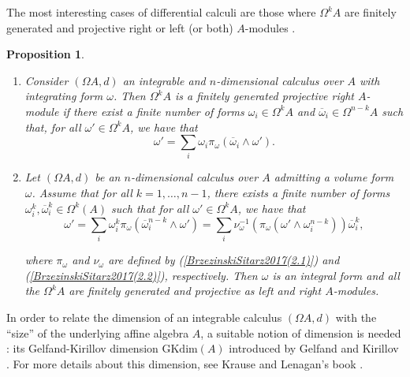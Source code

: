 \documentclass{amsart}
\newtheorem{proposition}[theorem]{Proposition}
\theoremstyle{definition}
\theoremstyle{remark}
\numberwithin{equation}{section}
\begin{document}
The most interesting cases of differential calculi are those where $\Omega^k A$ are finitely generated and projective right or left (or both) $A$-modules \cite{Brzezinski2011}.

\begin{proposition}\label{BrzezinskiSitarz2017Lemmas2.6and2.7}
\begin{enumerate}
\item [\rm (1)] \cite[Lemma 2.6]{BrzezinskiSitarz2017} Consider $(\Omega A, d)$ an integrable and $n$-dimensional calculus over $A$ with integrating form $\omega$. Then $\Omega^{k} A$ is a finitely generated projective right $A$-module if there exist a finite number of forms $\omega_i \in \Omega^{k} A$ and $\overline{\omega}_i \in \Omega^{n-k} A$ such that, for all $\omega' \in \Omega^{k} A$, we have that 
\begin{equation*}
\omega' = \sum_{i} \omega_i \pi_{\omega} (\overline{\omega}_i \wedge \omega').
\end{equation*}

\item [\rm (2)] \cite[Lemma 2.7]{BrzezinskiSitarz2017} Let $(\Omega A, d)$ be an $n$-dimensional calculus over $A$ admitting a volume form $\omega$. Assume that for all $k = 1, \ldots, n-1$, there exists a finite number of forms $\omega_{i}^{k},\overline{\omega}_{i}^{k} \in \Omega^{k}(A)$ such that for all $\omega'\in \Omega^kA$, we have that
\begin{equation*}
\omega'=\displaystyle\sum_i\omega_{i}^{k}\pi_\omega(\overline{\omega}_{i}^{n-k}\wedge\omega')=\displaystyle\sum_i\nu_{\omega}^{-1}(\pi_\omega(\omega'\wedge\omega_{i}^{n-k}))\overline{\omega}_{i}^{k},
\end{equation*}

where $\pi_{\omega}$ and $\nu_{\omega}$ are defined by {\rm (}\ref{BrzezinskiSitarz2017(2.1)}{\rm )} and {\rm (}\ref{BrzezinskiSitarz2017(2.2)}{\rm )}, respectively. Then $\omega$ is an integral form and all the $\Omega^{k}A$ are finitely generated and projective as left and right $A$-modules.
\end{enumerate}
\end{proposition}

In order to relate the dimension of an integrable calculus $(\Omega A,d)$ with the ``size'' of the underlying affine algebra $A$, a suitable notion of dimension is needed \cite[p. 421]{BrzezinskiSitarz2017}: its Gelfand-Kirillov dimension $\text{GKdim}(A)$ introduced by Gelfand and Kirillov \cite{GelfandKirillov1966, GelfandKirillov1966b}. For more details about this dimension, see Krause and Lenagan's book \cite{KrauseLenagan2000}.
\end{document}
